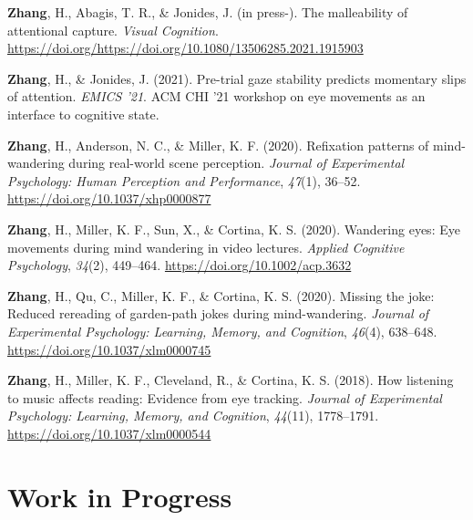 \documentclass[11pt, a4paper]{awesome-cv}
\begin{document}
\begingroup
\setlength{\parindent}{-0.5in}
\setlength{\leftskip}{0.5in}

\hypertarget{refs_published}{}
\leavevmode\hypertarget{ref-zhang_malleability_2021}{}%
\textbf{Zhang}, H., Abagis, T. R., \& Jonides, J. (in press-). The
malleability of attentional capture. \emph{Visual Cognition}.
\url{https://doi.org/https://doi.org/10.1080/13506285.2021.1915903}

\leavevmode\hypertarget{ref-zhang_pre-trial_2021}{}%
\textbf{Zhang}, H., \& Jonides, J. (2021). Pre-trial gaze stability
predicts momentary slips of attention. \emph{EMICS '21}. ACM CHI '21
workshop on eye movements as an interface to cognitive state.

\leavevmode\hypertarget{ref-zhang_scan-paths_2020}{}%
\textbf{Zhang}, H., Anderson, N. C., \& Miller, K. F. (2020). Refixation
patterns of mind-wandering during real-world scene perception.
\emph{Journal of Experimental Psychology: Human Perception and
Performance}, \emph{47}(1), 36--52.
\url{https://doi.org/10.1037/xhp0000877}

\leavevmode\hypertarget{ref-zhang_wandering_2020}{}%
\textbf{Zhang}, H., Miller, K. F., Sun, X., \& Cortina, K. S. (2020).
Wandering eyes: Eye movements during mind wandering in video lectures.
\emph{Applied Cognitive Psychology}, \emph{34}(2), 449--464.
\url{https://doi.org/10.1002/acp.3632}

\leavevmode\hypertarget{ref-zhang_missing_2019}{}%
\textbf{Zhang}, H., Qu, C., Miller, K. F., \& Cortina, K. S. (2020).
Missing the joke: Reduced rereading of garden-path jokes during
mind-wandering. \emph{Journal of Experimental Psychology: Learning,
Memory, and Cognition}, \emph{46}(4), 638--648.
\url{https://doi.org/10.1037/xlm0000745}

\leavevmode\hypertarget{ref-zhang_how_2018}{}%
\textbf{Zhang}, H., Miller, K. F., Cleveland, R., \& Cortina, K. S.
(2018). How listening to music affects reading: Evidence from eye
tracking. \emph{Journal of Experimental Psychology: Learning, Memory,
and Cognition}, \emph{44}(11), 1778--1791.
\url{https://doi.org/10.1037/xlm0000544}

\endgroup

\hypertarget{work-in-progress}{%
\section{Work in Progress}\label{work-in-progress}}

\begingroup
\setlength{\parindent}{-0.5in}
\setlength{\leftskip}{0.5in}
\end{document}
